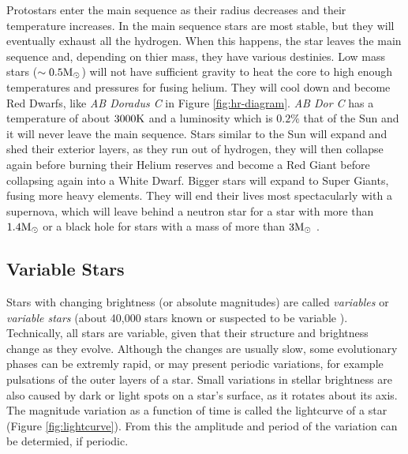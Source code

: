 Protostars enter the main sequence as their radius decreases and their temperature increases. In the main sequence stars are most stable, but they will eventually exhaust all the hydrogen. When this happens, the star leaves the main sequence and, depending on thier mass, they have various destinies. Low mass stars ($\sim 0.5 \rm{M_\odot}$) will not have sufficient gravity to heat the core to high enough temperatures and pressures for fusing helium. They will cool down and become Red Dwarfs, like \textit{AB Doradus C} in Figure \ref{fig:hr-diagram}. \textit{AB Dor C} has a temperature of about $3 000 \rm{K}$ and a luminosity which is $0.2\%$ that of the Sun and it will never leave the main sequence. Stars similar to the Sun will expand and shed their exterior layers, as they run out of hydrogen, they will then collapse again before burning their Helium reserves and become a Red Giant before collapsing again into a White Dwarf. Bigger stars will expand to Super Giants, fusing more heavy elements. They will end their lives most spectacularly with a supernova, which will leave behind a neutron star for a star with more than $1.4 \rm{M_\odot}$ or a black hole for stars with a mass of more than $3 \rm{M_\odot}$ \citep{Reese2005}.


\subsection{Variable Stars}
\label{variable-stars}

Stars with changing brightness (or absolute magnitudes) are called \textit{variables} or \textit{variable stars} (about 40,000 stars known or suspected to be variable \citep{Karttunen2017}). Technically, all stars are variable, given that their structure and brightness change as they evolve. Although the changes are usually slow, some evolutionary phases can be extremly rapid, or may present periodic variations, for example pulsations of the outer layers of a star. Small variations in stellar brightness are also caused by dark or light spots on a star's surface, as it rotates about its axis. The magnitude variation as a function of time is called the lightcurve of a star (Figure \ref{fig:lightcurve}). From this the amplitude and period of the variation can be determied, if periodic. 

